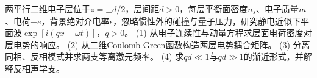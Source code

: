 两平行二维电子层位于\(z=\pm d/2\)，层间距\(d>0\)，每层平衡面密度\(n_s\)、电子质量\(m\)、电荷\(-e\)，背景绝对介电率\(\epsilon\)，忽略惯性外的碰撞与量子压力，研究静电近似下平面波\(\exp[i(qx-\omega t)]\)，\(q>0\)。
(1) 从电子连续性与动量方程求层面电荷密度对层电势的响应。
(2) 从二维Coulomb Green函数构造两层电势耦合矩阵。
(3) 分离同相、反相模式并求两支等离激元频率。
(4) 求\(qd\ll1\)与\(qd\gg1\)的渐近形式，并解释反相声学支。
